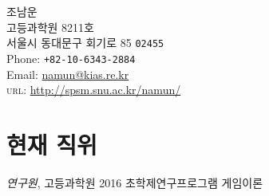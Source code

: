 \documentclass[11pt, a4paper]{article} %
\begin{document}

{\LARGE 조남운}\\[1cm] %
고등과학원 8211호\\ %
서울시 동대문구 회기로 85 \texttt{02455}
\\[.2cm]
Phone: \texttt{+82-10-6343-2884}\\ %
Email: \href{mailto:namun@kias.re.kr}{namun@kias.re.kr}\\ %
\textsc{url}: \href{http://spsm.snu.ac.kr/namun/}{http://spsm.snu.ac.kr/namun/}\\ %






\section*{현재 직위}

\emph{연구원}, 고등과학원 2016 초학제연구프로그램 게임이론
\end{document}
